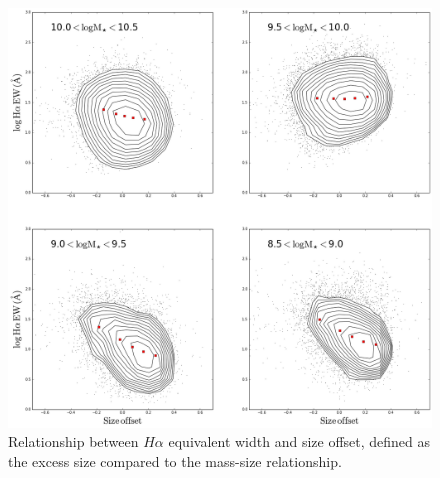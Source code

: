 \documentclass[iop]{emulateapj}
\begin{document}
\begin{figure}
	\centering
	\includegraphics[width=1.5 \columnwidth]{HA_EW.png}
	\caption{Relationship between $H\alpha$ equivalent width and size offset, defined as the excess size compared to the mass-size relationship. }
     \label{fig:HA_EW}

\end{figure}
\end{document}
